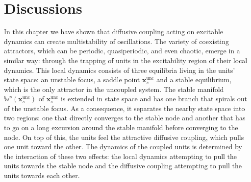 \begin{figure*}[h!]
    \label{fig:illustration_trapping}
\end{figure*}

\section{Discussions}\label{sec:discussions}
In this chapter we have shown that diffusive coupling acting on excitable dynamics can create multistability of oscillations. The variety of coexisting attractors, which can be periodic, quasiperiodic, and even chaotic, emerge in a similar way: through the trapping of units in the excitability region of their local dynamics. This local dynamics consists of three equilibria living in the units' state space: an unstable focus, a saddle point $\mathbf{x}_s^\mathrm{unc}$ and a stable equilibrium, which is the only attractor in the uncoupled system. The stable manifold $\mathbb{W}^s(\mathbf{x}_s^\mathrm{unc})$ of $\mathbf{x}_s^\mathrm{unc}$ is extended in state space and has one branch that spirals out of the unstable focus. As a consequence, it separates the nearby state space into two regions: one that directly converges to the stable node and another that has to go on a long excursion around the stable manifold before converging to the node. On top of this, the units feel the attractive diffusive coupling, which pulls one unit toward the other. The dynamics of the coupled units is determined by the interaction of these two effects: the local dynamics attempting to pull the units towards the stable node and the diffusive coupling attempting to pull the units towards each other.

